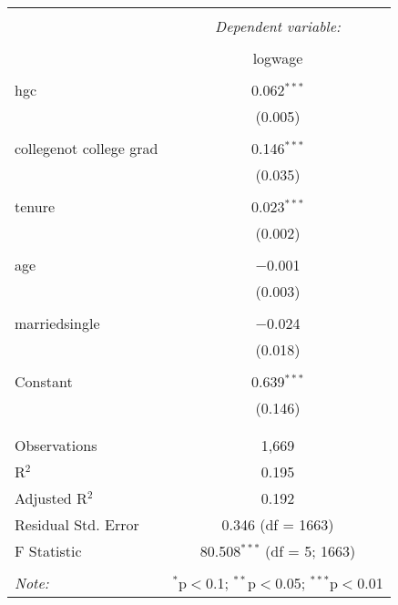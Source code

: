 \documentclass{article}
\begin{document}
\begin{table}[!htbp] \centering 
  \caption{} 
  \label{} 
\begin{tabular}{@{\extracolsep{5pt}}lc} 
\\[-1.8ex]\hline 
\hline \\[-1.8ex] 
 & \multicolumn{1}{c}{\textit{Dependent variable:}} \\ 
\cline{2-2} 
\\[-1.8ex] & logwage \\ 
\hline \\[-1.8ex] 
 hgc & 0.062$^{***}$ \\ 
  & (0.005) \\ 
  & \\ 
 collegenot college grad & 0.146$^{***}$ \\ 
  & (0.035) \\ 
  & \\ 
 tenure & 0.023$^{***}$ \\ 
  & (0.002) \\ 
  & \\ 
 age & $-$0.001 \\ 
  & (0.003) \\ 
  & \\ 
 marriedsingle & $-$0.024 \\ 
  & (0.018) \\ 
  & \\ 
 Constant & 0.639$^{***}$ \\ 
  & (0.146) \\ 
  & \\ 
\hline \\[-1.8ex] 
Observations & 1,669 \\ 
R$^{2}$ & 0.195 \\ 
Adjusted R$^{2}$ & 0.192 \\ 
Residual Std. Error & 0.346 (df = 1663) \\ 
F Statistic & 80.508$^{***}$ (df = 5; 1663) \\ 
\hline 
\hline \\[-1.8ex] 
\textit{Note:}  & \multicolumn{1}{r}{$^{*}$p$<$0.1; $^{**}$p$<$0.05; $^{***}$p$<$0.01} \\ 
\end{tabular} 
\end{table} 
\end{document}
